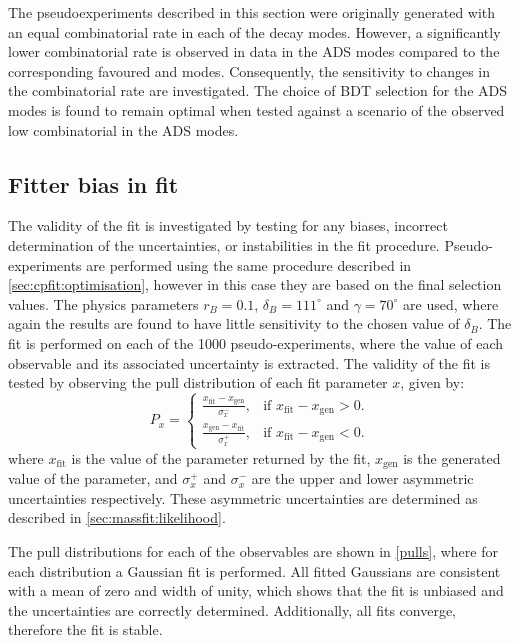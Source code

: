 The pseudoexperiments described in this section were originally generated with an equal combinatorial rate in each of the \Dz decay modes. However, a significantly lower combinatorial rate is observed in data in the ADS modes compared to the corresponding favoured \kpi and \kpipipi modes. Consequently, the sensitivity to changes in the combinatorial rate are investigated. The choice of BDT selection for the ADS modes is found to remain optimal when tested against a scenario of the observed low combinatorial in the ADS modes. 

\subsection{Fitter bias in \CP fit}
\label{sec:cpfit:fitterbias}

The validity of the \CP fit is investigated by testing for any biases, incorrect determination of the uncertainties, or instabilities in the \CP fit procedure. Pseudo-experiments are performed using the same procedure described in \sect\ref{sec:cpfit:optimisation}, however in this case they are based on the final selection values. The physics parameters $r_B = 0.1$, $\delta_B = 111^{\circ}$ and $\gamma = 70^{\circ}$ are used, where again the results are found to have little sensitivity to the chosen value of $\delta_B$. The \CP fit is performed on each of the 1000 pseudo-experiments, where the value of each \CP observable and its associated uncertainty is extracted. The validity of the fit is tested by observing the pull distribution of each fit parameter $x$, given by:
\begin{equation*}
P_x = \begin{cases}
	\frac{x_{\text{fit}} - x_{\text{gen}}}{\sigma_x^-}, & \text{if } x_{\text{fit}} - x_{\text{gen}} > 0. \\
	\frac{x_{\text{gen}} - x_{\text{fit}}}{\sigma_x^+}, & \text{if } x_{\text{fit}} - x_{\text{gen}} < 0.
	\end{cases}
\end{equation*}
where $x_{\text{fit}}$ is the value of the parameter returned by the fit, $x_{\text{gen}}$ is the generated value of the parameter, and $\sigma_x^+$ and $\sigma_x^-$ are the upper and lower asymmetric uncertainties respectively. These asymmetric uncertainties are determined as described in \sect\ref{sec:massfit:likelihood}. 

The pull distributions for each of the \CP observables are shown in \fig\ref{pulls}, where for each distribution a Gaussian fit is performed. All fitted Gaussians are consistent with a mean of zero and width of unity, which shows that the \CP fit is unbiased and the uncertainties are correctly determined. Additionally, all fits converge, therefore the fit is stable. 
 
